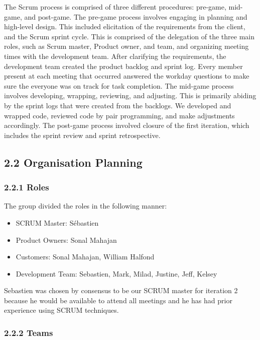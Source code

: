 \documentclass[]{article}
\begin{document}
The Scrum process is comprised of three different procedures: pre-game,
mid-game, and post-game. The pre-game process involves engaging in
planning and high-level design. This included elicitation of the
requirements from the client, and the Scrum sprint cycle. This is
comprised of the delegation of the three main roles, such as Scrum
master, Product owner, and team, and organizing meeting times with the
development team. After clarifying the requirements, the development
team created the product backlog and sprint log. Every member present at
each meeting that occurred answered the workday questions to make sure
the everyone was on track for task completion. The mid-game process
involves developing, wrapping, reviewing, and adjusting. This is
primarily abiding by the sprint logs that were created from the
backlogs. We developed and wrapped code, reviewed code by pair
programming, and make adjustments accordingly. The post-game process
involved closure of the first iteration, which includes the sprint
review and sprint retrospective.

\subsection{2.2 Organisation Planning}\label{organisation-planning}

\subsubsection{2.2.1 Roles}\label{roles}

The group divided the roles in the following manner:

\begin{itemize}
\itemsep1pt\parskip0pt
\item
  SCRUM Master: Sébastien
\item
  Product Owners: Sonal Mahajan
\item
  Customers: Sonal Mahajan, William Halfond
\item
  Development Team: Sebastien, Mark, Milad, Justine, Jeff, Kelsey
\end{itemize}

Sebastien was chosen by consensus to be our SCRUM master for iteration 2
because he would be available to attend all meetings and he has had
prior experience using SCRUM techniques.

\subsubsection{2.2.2 Teams}\label{teams}
\end{document}
